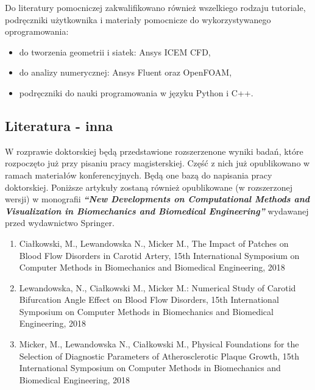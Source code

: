 \documentclass[11pt]{article} %
\begin{document}
Do literatury pomocniczej zakwalifikowano również wszelkiego rodzaju tutoriale, podręczniki użytkownika i materiały pomocnicze do wykorzystywanego oprogramowania:
\begin{itemize}
\item do tworzenia geometrii i siatek: Ansys ICEM CFD,
\item do analizy numerycznej: Ansys Fluent oraz OpenFOAM,
\item podręczniki do nauki programowania w języku Python i C++.
\end{itemize}




\subsection{Literatura - inna} %

W rozprawie doktorskiej będą przedstawione rozszerzenone wyniki badań, które rozpoczęto już przy pisaniu pracy magisterskiej. Część z nich już opublikowano w ramach materiałów konferencyjnych. Będą one bazą do napisania pracy doktorskiej. Poniższe artykuły zostaną również opublikowane (w rozszerzonej wersji) w monografii \textbf{\textit{“New Developments on Computational Methods and Visualization in Biomechanics and Biomedical Engineering”}} wydawanej przed wydawnictwo Springer.
\begin{enumerate}
\item Ciałkowski, M., Lewandowska N., Micker M., The Impact of Patches on Blood Flow Disorders in Carotid Artery, 15th International Symposium on Computer Methods in Biomechanics and Biomedical Engineering, 2018
\item Lewandowska, N., Ciałkowski M., Micker M.: Numerical Study of Carotid Bifurcation Angle Effect on Blood Flow Disorders, 15th International Symposium on Computer Methods in Biomechanics and Biomedical Engineering, 2018
\item Micker, M., Lewandowska N., Ciałkowski M., Physical Foundations for the Selection of Diagnostic Parameters of Atherosclerotic Plaque Growth, 15th International Symposium on Computer Methods in Biomechanics and Biomedical Engineering, 2018
\end{enumerate}



\end{document}
